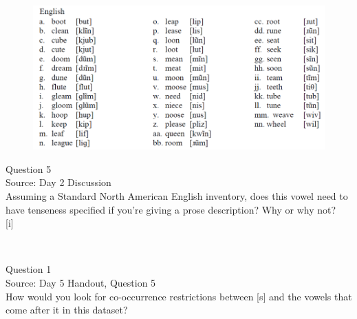 \documentclass[12pt]{article}
\begin{document}
\begin{figure}[H]
\includegraphics{../images/english12.png}
\end{figure}

\newpage

{\large Question 5}\\

Source: Day 2 Discussion\\

Assuming a Standard North American English inventory, does this vowel need to have tenseness specified if you're giving a prose description? Why or why not?\\

{[i]}


\newpage

\begin{center}
\textbf{{\color{red}{\HUGE END OF EXAM}}}\\

\end{center}
\newpage

\begin{center}
\textbf{{\color{blue}{\HUGE START OF EXAM\\}}}

\textbf{{\color{blue}{\HUGE Student ID: 5540\\}}}

\textbf{{\color{blue}{\HUGE 3:45 - 4:00 PM\\}}}

\end{center}
\newpage

{\large Question 1}\\

Source: Day 5 Handout, Question 5\\

How would you look for co-occurrence restrictions between [s] and the vowels that come after it in this dataset?\\
\end{document}
